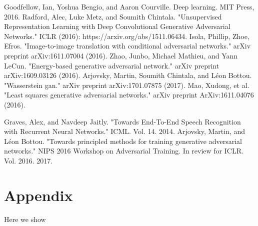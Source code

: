 \documentclass{article}
\begin{document}

\noindent [1] Goodfellow, Ian, Yoshua Bengio, and Aaron Courville. Deep learning. MIT Press, 2016. \newline
\noindent [2] Radford, Alec, Luke Metz, and Soumith Chintala. "Unsupervised Representation Learning with Deep Convolutional Generative Adversarial Networks." ICLR (2016): https://arxiv.org/abs/1511.06434.
\noindent [3] Isola, Phillip, Zhoe, Efros. "Image-to-image translation with conditional adversarial networks." arXiv preprint arXiv:1611.07004 (2016).
\noindent [4] Zhao, Junbo, Michael Mathieu, and Yann LeCun. "Energy-based generative adversarial network." arXiv preprint arXiv:1609.03126 (2016).
\noindent [5] Arjovsky, Martin, Soumith Chintala, and Léon Bottou. "Wasserstein gan." arXiv preprint arXiv:1701.07875 (2017).
\noindent [6] Mao, Xudong, et al. "Least squares generative adversarial networks." arXiv preprint ArXiv:1611.04076 (2016).


\noindent [7] Graves, Alex, and Navdeep Jaitly. "Towards End-To-End Speech Recognition with Recurrent Neural Networks." ICML. Vol. 14. 2014.
\noindent [8] Arjovsky, Martin, and Léon Bottou. "Towards principled methods for training generative adversarial networks." NIPS 2016 Workshop on Adversarial Training. In review for ICLR. Vol. 2016. 2017.


\appendix

\section{Appendix}
Here we show 
\end{document}

